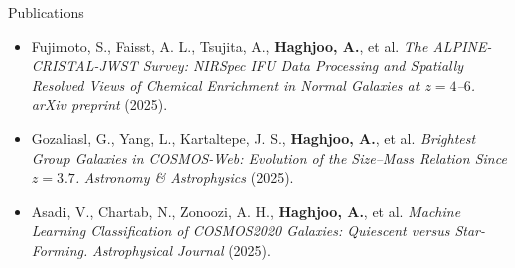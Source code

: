 \documentclass[]{kyvernitis-resume}
\begin{document}
\begin{section}{Publications}
\begin{itemize}
\item Fujimoto, S., Faisst, A. L., Tsujita, A., \textbf{Haghjoo, A.}, et al.
\textit{The ALPINE-CRISTAL-JWST Survey: NIRSpec IFU Data Processing and Spatially Resolved Views of Chemical Enrichment in Normal Galaxies at $z=4$--$6$.}
\textit{arXiv preprint} (2025).

\item Gozaliasl, G., Yang, L., Kartaltepe, J. S., \textbf{Haghjoo, A.}, et al.
\textit{Brightest Group Galaxies in COSMOS-Web: Evolution of the Size--Mass Relation Since $z=3.7$.}
\textit{Astronomy \& Astrophysics} (2025).

\item Asadi, V., Chartab, N., Zonoozi, A. H., \textbf{Haghjoo, A.}, et al.
\textit{Machine Learning Classification of COSMOS2020 Galaxies: Quiescent versus Star-Forming.}
\textit{Astrophysical Journal} (2025).

\end{itemize}

\end{section}
\end{document}
